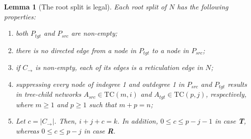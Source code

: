 \documentclass[11pt]{article}
\newtheorem{lemma}[theorem]{Lemma}
\theoremstyle{definition}
\theoremstyle{remark}
\newcommand{\TC}{\text{TC}}
\begin{document}
\begin{lemma}[The root split is legal]\label{lem:legal} Each root split of $N$ has the following properties: 
\begin{enumerate} 
\item[\rm(a)] both $P_{tgt}$ and $P_{src}$ are non-empty; 
\item[\rm(b)] there is no directed edge from a node in $P_{tgt}$ to a node in $P_{src}$; 
\item[\rm(c)] if $C_{\rightarrow}$ is non-empty, each of its edges is a reticulation edge in $N$;
\item[\rm(d)] suppressing every node of indegree 1 and outdegree 1 in $P_{src}$ and $P_{tgt}$ results in tree-child networks $A_{src}\in \TC(m,i)$ and $A_{tgt}\in \TC(p,j)$, respectively, where $m\ge1$ and $p\ge1$ such that $m+p=n$; \item[\rm(e)] Let $c=\vert C_{\rightarrow}\vert$. Then, $i+j+c=k$. In addition,  $0\leq c\leq p-j-1$ in case \textbf{T}, whereas $0\leq c\leq p-j$ in case \textbf{R}.
\end{enumerate} 
\end{lemma}
\end{document}
